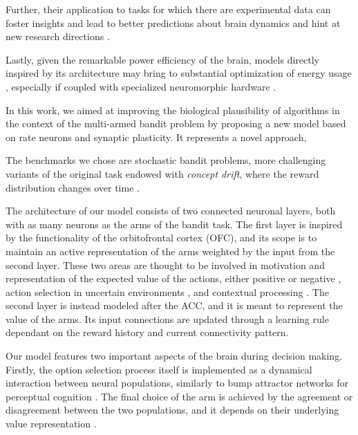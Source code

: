 Further, their application to tasks for which there are experimental data can foster insights and lead to better predictions about brain dynamics and hint at new research directions \cite{liuSeeingBelievingBrainInspired2023}.

Lastly, given the remarkable power efficiency of the brain, models directly inspired by its architecture may bring to substantial optimization of energy usage \cite{EvaluationBioInspiredModels}, especially if coupled with specialized neuromorphic hardware \cite{ReviewNeuroscienceInspiredMachine}.

\hfill \break
\indent In this work, we aimed at improving the biological plausibility of algorithms in the context of the multi-armed bandit problem by proposing a new model based on rate neurons and synaptic plasticity.
It represents a novel approach, 


The benchmarks we chose are stochastic bandit problems, more challenging variants of the original task endowed with \textit{concept drift}, where the reward distribution changes over time \cite{garivierUpperConfidenceBoundPolicies2008, besbesStochasticMultiArmedBanditProblem2014, cavenaghiNonStationaryMultiArmed2021}.

The architecture of our model consists of two connected neuronal layers, both with as many neurons as the arms of the bandit task.
The first layer is inspired by the functionality of the orbitofrontal cortex (OFC), and its scope is to maintain an active representation of the arms weighted by the input from the second layer. These two areas are thought to be involved in motivation and representation of the expected value of the actions, either positive or negative \cite{odohertyAbstractRewardPunishment2001, ricebergRewardStabilityDetermines2012, tremblayRelativeRewardPreference1999}, action selection in uncertain environments \cite{elliottDissociableFunctionsMedial2000}, and contextual processing \cite{frankAnatomyDecisionStriatoorbitofrontal2006}.
The second layer is instead modeled after the ACC, and it is meant to represent the value of the arms. Its input connections are updated through a learning rule dependant on the reward history and current connectivity pattern.

Our model features two important aspects of the brain during decision making. Firstly, the option selection process itself is implemented as a dynamical interaction between neural populations, similarly to bump attractor networks for perceptual cognition \cite{carrollEncodingCertaintyBump2014, esnaola-acebesBumpAttractorDynamics2021}.
The final choice of the arm is achieved by the agreement or disagreement between the two populations, and it depends on their underlying value representation \cite{bariDynamicDecisionMaking2021, houstonMatchingBehavioursRewards2021}.

